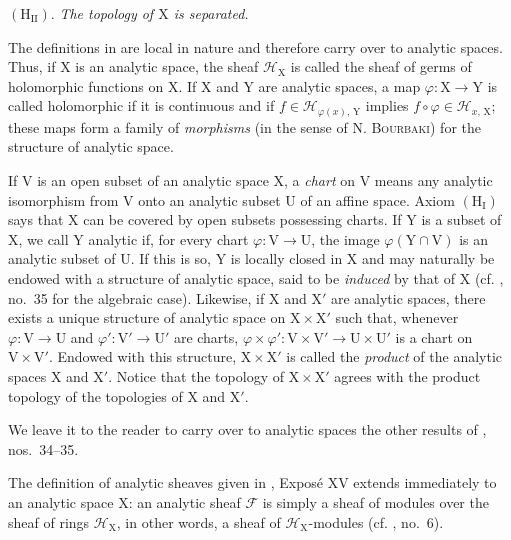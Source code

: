 $(\mathrm{H}_{\mathrm{II}})$. \emph{The topology of $\mathrm{X}$ is separated.}

The definitions in  are local in nature and therefore carry over to analytic spaces. Thus, if $\mathrm{X}$ is an analytic space, the sheaf $\mathcal{H}_{\mathrm{X}}$ is called the sheaf of germs of holomorphic functions on $\mathrm{X}$. If $\mathrm{X}$ and $\mathrm{Y}$ are analytic spaces, a map $\varphi:\mathrm{X}\to\mathrm{Y}$ is called holomorphic if it is continuous and if $f\in\mathcal{H}_{\varphi(x),\,\mathrm{Y}}$ implies $f\circ\varphi\in\mathcal{H}_{x,\,\mathrm{X}}$; these maps form a family of \emph{morphisms} (in the sense of N. \textsc{Bourbaki}) for the structure of analytic space.

If $\mathrm{V}$ is an open subset of an analytic space $\mathrm{X}$, a \emph{chart} on $\mathrm{V}$ means any analytic isomorphism from $\mathrm{V}$ onto an analytic subset $\mathrm{U}$ of an affine space. Axiom $(\mathrm{H}_{\mathrm{I}})$ says that $\mathrm{X}$ can be covered by open subsets possessing charts. If $\mathrm{Y}$ is a subset of $\mathrm{X}$, we call $\mathrm{Y}$ analytic if, for every chart $\varphi:\mathrm{V}\to\mathrm{U}$, the image $\varphi(\mathrm{Y}\cap\mathrm{V})$ is an analytic subset of $\mathrm{U}$. If this is so, $\mathrm{Y}$ is locally closed in $\mathrm{X}$ and may naturally be endowed with a structure of analytic space, said to be \emph{induced} by that of $\mathrm{X}$ (cf. , no.~35 for the algebraic case). Likewise, if $\mathrm{X}$ and $\mathrm{X}'$ are analytic spaces, there exists a unique structure of analytic space on $\mathrm{X}\times\mathrm{X}'$ such that, whenever $\varphi:\mathrm{V}\to\mathrm{U}$ and $\varphi':\mathrm{V}'\to\mathrm{U}'$ are charts, $\varphi\times\varphi':\mathrm{V}\times\mathrm{V}'\to\mathrm{U}\times\mathrm{U}'$ is a chart on $\mathrm{V}\times\mathrm{V}'$. Endowed with this structure, $\mathrm{X}\times\mathrm{X}'$ is called the \emph{product} of the analytic spaces $\mathrm{X}$ and $\mathrm{X}'$. Notice that the topology of $\mathrm{X}\times\mathrm{X}'$ agrees with the product topology of the topologies of $\mathrm{X}$ and $\mathrm{X}'$.

We leave it to the reader to carry over to analytic spaces the other results of , nos.~34--35.


The definition of analytic sheaves given in , Expos\'e XV extends immediately to an analytic space $\mathrm{X}$: an analytic sheaf $\mathcal{F}$ is simply a sheaf of modules over the sheaf of rings $\mathcal{H}_{\mathrm{X}}$, in other words, a sheaf of $\mathcal{H}_{\mathrm{X}}$-modules (cf. , no.~6).


